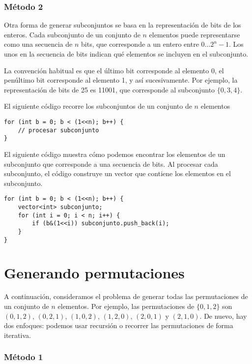 \subsubsection{Método 2}

Otra forma de generar subconjuntos se basa en
la representación de bits de los enteros.
Cada subconjunto de un conjunto de $n$ elementos
puede representarse como una secuencia de $n$ bits,
que corresponde a un entero entre $0 \ldots 2^n-1$.
Los unos en la secuencia de bits indican
qué elementos se incluyen en el subconjunto.

La convención habitual es que
el último bit corresponde al elemento 0,
el penúltimo bit corresponde al elemento 1,
y así sucesivamente.
Por ejemplo, la representación de bits de 25
es 11001, que corresponde al subconjunto $\{0,3,4\}$.

El siguiente código recorre los subconjuntos
de un conjunto de $n$ elementos

\begin{lstlisting}
for (int b = 0; b < (1<<n); b++) {
    // procesar subconjunto
}
\end{lstlisting}

El siguiente código muestra cómo podemos encontrar
los elementos de un subconjunto que corresponde a una secuencia de bits.
Al procesar cada subconjunto,
el código construye un vector que contiene los
elementos en el subconjunto.

\begin{lstlisting}
for (int b = 0; b < (1<<n); b++) {
    vector<int> subconjunto;
    for (int i = 0; i < n; i++) {
        if (b&(1<<i)) subconjunto.push_back(i);
    }
}
\end{lstlisting}

\section{Generando permutaciones}


A continuación, consideramos el problema de generar
todas las permutaciones de un conjunto de $n$ elementos.
Por ejemplo, las permutaciones de $\{0,1,2\}$ son
$(0,1,2)$, $(0,2,1)$, $(1,0,2)$, $(1,2,0)$,
$(2,0,1)$ y $(2,1,0)$.
De nuevo, hay dos enfoques:
podemos usar recursión o recorrer las
permutaciones de forma iterativa.

\subsubsection{Método 1}

